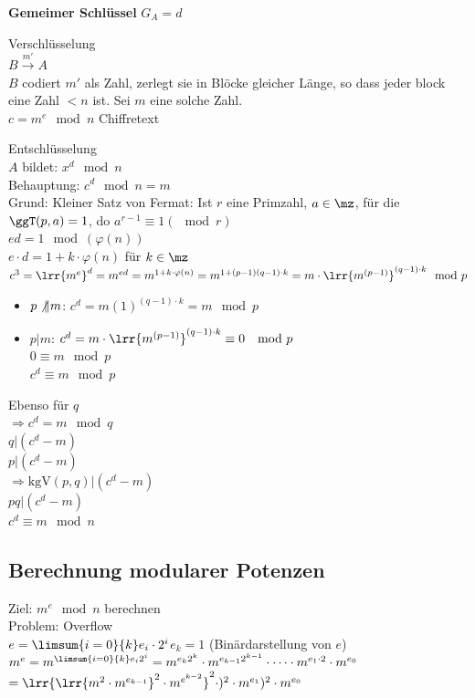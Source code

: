 				\textbf{Gemeimer Schlüssel} $G_A=d$
			\item Verschlüsselung\\
				$B\overset{m'}{\longrightarrow} A$	\\
				$B$ codiert $m'$ als Zahl, zerlegt sie in Blöcke gleicher Länge, so dass jeder block eine Zahl $<n$ ist. Sei $m$ eine solche Zahl.\\
				$c=m^e\mod n$ Chiffretext
			\item Entschlüsselung\\
			$A$ bildet: $x^d\mod n$\\
			Behauptung: $c^d\mod n=m$\\
			Grund: Kleiner Satz von Fermat: Ist $r$ eine Primzahl, $a\in\mz$, für die $\ggT(p,a)=1$, do $a^{r-1}\equiv 1(\mod r)$\\
		$ed=1\mod(\varphi(n))$\\
		$e\cdot d=1+k\cdot\varphi(n)$ für $k\in\mz$\\
		$c^3=\lrr{m^e}^d=m^{ed}=m^{1+k\cdot\varphi(n)}=m^{1+(p-1)(q-1)\cdot k}=m\cdot\lrr{m^{(p-1)}}^{(q-1)\cdot k}\mod p$
		\begin{itemize}
			\item $p\not\|m$: $c^d=m(1)^{(q-1)\cdot k}=m\mod p$
			\item $p|m$: $c^d=m\cdot\lrr{m^{(p-1)}}^{(q-1)\cdot k}\equiv 0\ \mod p$\\
			$0\equiv m\mod p$\\
			$c^d\equiv m\mod p$
		\end{itemize}
		Ebenso für $q$\\
		$\Rightarrow c^d=m\mod q$\\
		$q|(c^d-m)$\\
		$p|(c^d-m)$\\
		$\Rightarrow\mbox{kgV}(p,q)|(c^d-m)$\\
		$pq|(c^d-m)$\\
		$c^d\equiv m\mod n$
		\subExEnd
		
	\subsection{Berechnung modularer Potenzen}
		Ziel: $m^e\mod n$ berechnen\\
		Problem: Overflow\\
		$e=\limsum{i=0}{k}e_i\cdot 2^i$\quad $e_k=1$ (Binärdarstellung von $e$)\\
		$m^e=m^{\limsum{i=0}{k}e_i2^i}=m^{e_k2^k}\cdot m^{e_{k-1}2^{k-1}}\cdot\dots\cdot m^{e_1\cdot 2}\cdot m^{e_0}$\\
		$=\lrr{\lrr{m^2\cdot m^{e_{k-1}}}^2\cdot m^{e^{k-2}}}^2\cdot)^2\cdot m^{e_1})^2\cdot m^{e_0}$